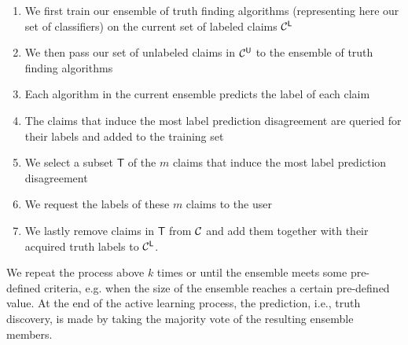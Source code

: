 
\begin{enumerate}
 \item We first train our ensemble of truth finding algorithms (representing here our set of classifiers)  on the current set of labeled claims
 $\mathcal{C}^{\mathsf{L}}$ 
 \item We then pass our set of unlabeled claims in $\mathcal{C}^{\mathsf{U}}$ to the ensemble of truth finding algorithms
 \item Each algorithm in the current ensemble predicts the label of each claim
 \item The claims that induce the most label prediction disagreement are queried for their labels and added to the training set
 \item We select a subset $\mathsf{T}$ of the $m$ claims that induce the most label prediction disagreement
 \item We request the labels of these $m$ claims to the user 
 \item We lastly remove claims in $\mathsf{T}$ from $\mathcal{C}$ and add them together with their acquired truth labels to $\mathcal{C}^{\mathsf{L}}$.
\end{enumerate}

We repeat the process above $k$ times or until the ensemble meets some pre-defined criteria, e.g. when the size of the ensemble
reaches a certain pre-defined value. At the end of the active learning process, the prediction, i.e., truth discovery, is made 
by taking the majority vote of the resulting ensemble members. 
